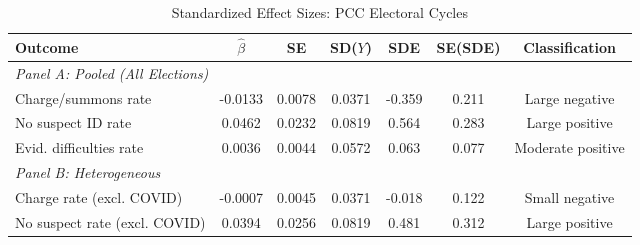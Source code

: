 \begin{table}[htbp]
\centering
\caption{Standardized Effect Sizes: PCC Electoral Cycles}
\label{tab:sde}
\begin{adjustbox}{max width=\textwidth}
\begin{tabular}{lcccccc}
\hline\hline
 Outcome & $\hat{\beta}$ & SE & SD($Y$) & SDE & SE(SDE) & Classification \\
\hline
\multicolumn{7}{l}{\textit{Panel A: Pooled (All Elections)}} \\
Charge/summons rate & -0.0133 & 0.0078 & 0.0371 & -0.359 & 0.211 & Large negative \\
No suspect ID rate & 0.0462 & 0.0232 & 0.0819 & 0.564 & 0.283 & Large positive \\
Evid. difficulties rate & 0.0036 & 0.0044 & 0.0572 & 0.063 & 0.077 & Moderate positive \\
\hline
\multicolumn{7}{l}{\textit{Panel B: Heterogeneous}} \\
Charge rate (excl. COVID) & -0.0007 & 0.0045 & 0.0371 & -0.018 & 0.122 & Small negative \\
No suspect rate (excl. COVID) & 0.0394 & 0.0256 & 0.0819 & 0.481 & 0.312 & Large positive \\
\hline\hline
\end{tabular}
\end{adjustbox}
\begin{tablenotes}[flushleft]

\end{tablenotes}
\end{table}
